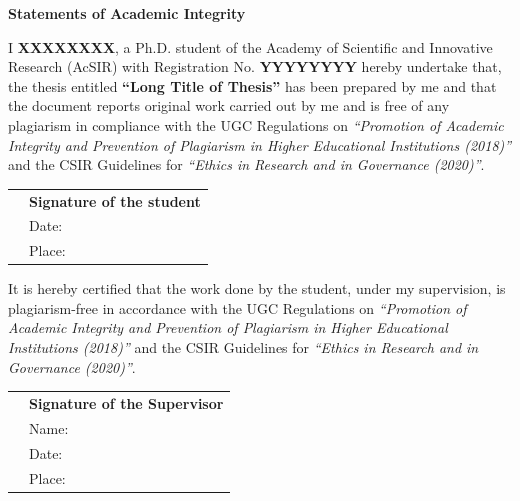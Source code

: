 \thispagestyle{plain}
\begin{center}
\fontsize{16pt}{24pt}\selectfont \textbf{Statements of Academic Integrity}
\end{center}
\hline

\vspace{0.3cm}
\fontsize{12pt}{24pt}\selectfont I \textbf{XXXXXXXX}, a Ph.D. student of the Academy of Scientific and Innovative Research (AcSIR) with Registration No. \textbf{YYYYYYYY} hereby undertake that, the thesis entitled \textbf{“Long Title of Thesis”} has been prepared by me and that the document reports original work carried out by me and is free of any plagiarism in compliance with the UGC Regulations on \emph{“Promotion of Academic Integrity and Prevention of Plagiarism in Higher Educational Institutions (2018)”} and the CSIR Guidelines for \emph{“Ethics in Research and in Governance (2020)”}.

\vspace{3cm}
\begin{table}[h]
\centering
\fontsize{12pt}{18pt}\selectfont
\begin{tabular}{p{9cm}p{5cm}}
 & \textbf{Signature of the student}\\
 & Date: \\
 & Place: \\
\end{tabular}
\end{table}
\hline
\vspace{0.3cm}
\fontsize{12pt}{24pt}\selectfont It is hereby certified that the work done by the student, under my supervision, is plagiarism-free in accordance with the UGC Regulations on \emph{“Promotion of Academic Integrity and Prevention of Plagiarism in Higher Educational Institutions (2018)”} and the CSIR Guidelines for \emph{“Ethics in Research and in Governance (2020)”}.

\vspace{3cm}
\begin{table}[h]
\centering
\fontsize{12pt}{18pt}\selectfont
\begin{tabular}{p{9cm}p{5cm}}
 & \textbf{Signature of the Supervisor}\\
 & Name: \\
 & Date: \\
 & Place: \\
\end{tabular}
\end{table}

